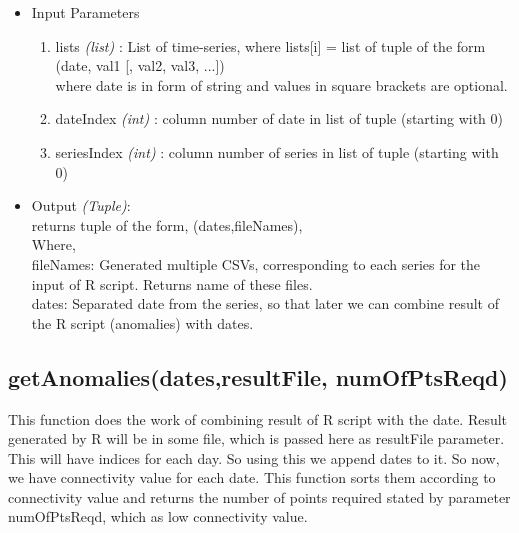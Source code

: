\begin{itemize}
 \item Input Parameters
 
 \begin{enumerate}
  \item lists \textit{(list)} : List of time-series, where lists[i] = list of 
tuple of the form (date, val1 [, val2, val3, ...]) \\
    where date is in form of string and values in square brackets are optional.
  \item dateIndex \textit{(int)} : column number of date in list of tuple 
(starting with 0)
  \item seriesIndex \textit{(int)} : column number of series in list of tuple 
(starting with 0)

 \end{enumerate}

 \item Output \textit{(Tuple)}: \\
  returns tuple of the form, (dates,fileNames), \\
  
  Where, \\
  fileNames: Generated multiple CSVs, corresponding to each series for the 
input of R script. Returns name of these files. \\
  dates: Separated date from the series, so that later we can combine result of 
the R script (anomalies) with dates.

 
\end{itemize}


\subsection{getAnomalies(dates,resultFile, numOfPtsReqd)}

This function does the work of combining result of R script with the date. 
Result generated by R will be in some file, which is passed here as resultFile 
parameter. This will have indices for each day. So using this we append dates 
to it. So now, we have connectivity value for each date. This function sorts 
them according to connectivity value and returns the number of points required 
stated by parameter numOfPtsReqd, which as low connectivity value. 


